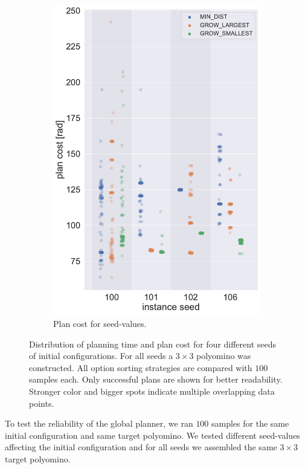 \begin{figure}
\begin{subfigure}[h]{0.5\textwidth}
		\includegraphics[width=\textwidth]{figures/plots/AR_cost.pdf}
		\caption{Plan cost for seed-values.}
		\label{fig:AR_cost}
	\end{subfigure}
	\caption[Planning time and plan cost for different seeds]{Distribution of planning time and plan cost for four different seeds of initial configurations. For all seeds a $3 \times 3$ polyomino was constructed. All option sorting strategies are compared with $100$ samples each. Only successful plans are shown for better readability. Stronger color and bigger spots indicate multiple overlapping data points.}
	\label{fig:AR}
\end{figure}

To test the reliability of the global planner, we ran $100$ samples for the same initial configuration and same target polyomino.
We tested different seed-values affecting the initial configuration and for all seeds we assembled the same $3 \times 3$ target polyomino.

